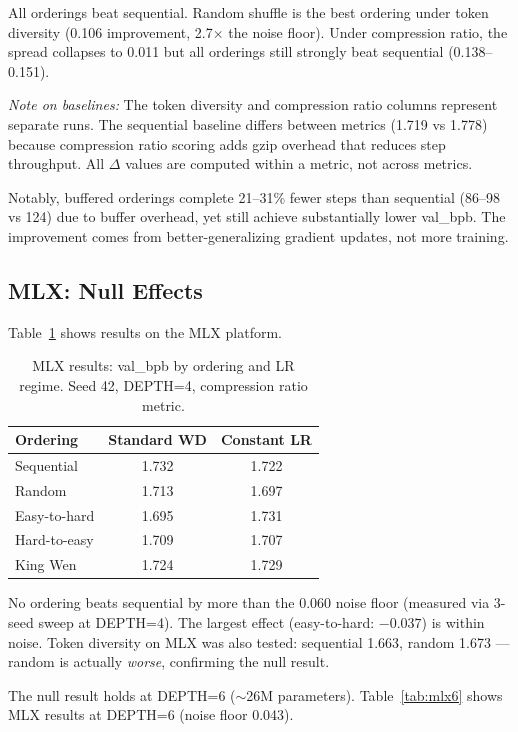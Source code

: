 \documentclass{article}
\begin{document}
All orderings beat sequential. Random shuffle is the best ordering
under token diversity (0.106 improvement, 2.7$\times$ the noise floor).
Under compression ratio, the spread collapses to 0.011 but all orderings
still strongly beat sequential (0.138--0.151).

\emph{Note on baselines:} The token diversity and compression ratio
columns represent separate runs. The sequential baseline differs between
metrics (1.719 vs 1.778) because compression ratio scoring adds gzip
overhead that reduces step throughput. All $\Delta$ values are computed
within a metric, not across metrics.

Notably, buffered orderings complete 21--31\% fewer steps than sequential
(86--98 vs 124) due to buffer overhead, yet still achieve substantially
lower val\_bpb. The improvement comes from better-generalizing gradient
updates, not more training.

\subsection{MLX: Null Effects}

Table~\ref{tab:mlx} shows results on the MLX platform.

\begin{table}[h]
\centering
\caption{MLX results: val\_bpb by ordering and LR regime.
Seed 42, DEPTH=4, compression ratio metric.}
\label{tab:mlx}
\begin{tabular}{lcc}
\toprule
Ordering & Standard WD & Constant LR \\
\midrule
Sequential       & 1.732 & 1.722 \\
Random           & 1.713 & 1.697 \\
Easy-to-hard     & 1.695 & 1.731 \\
Hard-to-easy     & 1.709 & 1.707 \\
King Wen         & 1.724 & 1.729 \\
\bottomrule
\end{tabular}
\end{table}

No ordering beats sequential by more than the 0.060 noise floor
(measured via 3-seed sweep at DEPTH=4). The largest effect
(easy-to-hard: $-0.037$) is within noise. Token diversity on MLX
was also tested: sequential 1.663, random 1.673 --- random is
actually \emph{worse}, confirming the null result.

The null result holds at DEPTH=6 ($\sim$26M parameters).
Table~\ref{tab:mlx6} shows MLX results at DEPTH=6 (noise floor 0.043).
\end{document}

